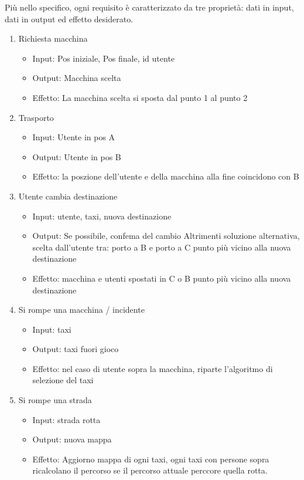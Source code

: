 Più nello specifico, ogni requisito è caratterizzato da tre proprietà: dati in input, dati in output ed effetto desiderato.

\begin{enumerate}
	\item Richiesta macchina
		\begin{itemize}
			\item Input:  Pos iniziale, Pos finale, id utente
			\item Output: Macchina scelta
			\item Effetto: La macchina scelta si sposta dal punto 1 al punto 2
		\end{itemize}

	\item Trasporto
		\begin{itemize}
			\item Input: Utente in pos A
			\item Output: Utente in pos B
			\item Effetto: la poszione dell'utente e della macchina alla fine coincidono con B
		\end{itemize}

	\item Utente cambia destinazione
		\begin{itemize}
			\item Input: utente, taxi, nuova destinazione
			\item Output: Se possibile, confema del cambio
			Altrimenti soluzione alternativa, scelta dall'utente tra: porto a B e porto a C punto più vicino alla nuova destinazione
			\item Effetto:  macchina e utenti spostati in C o B punto più vicino alla nuova destinazione
		\end{itemize}

	\item Si rompe una macchina / incidente
		\begin{itemize}
			\item Input: taxi
			\item Output: taxi fuori gioco
			\item Effetto: nel caso di utente sopra la macchina, riparte l'algoritmo di selezione del taxi
		\end{itemize}

	\item Si rompe una strada
		\begin{itemize}
			\item Input: strada rotta
			\item Output: nuova mappa
			\item Effetto: Aggiorno mappa di ogni taxi, ogni taxi con persone sopra ricalcolano il percorso se il percorso attuale perccore quella rotta.
		\end{itemize}

\end{enumerate}


